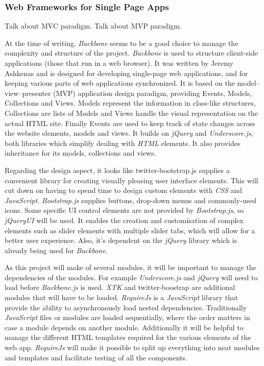 \documentclass[a4paper,11pt,titlepage]{article}
\begin{document}
\subsubsection{Web Frameworks for Single Page Apps}

Talk about MVC paradigm. Talk about MVP paradigm.

At the time of writing, \textit{Backbone} seems to be a good choice to manage the complexity and structure of the project. \textit{Backbone} is used to structure client-side applications (those that run in a web browser). It was written by Jeremy Ashkenas and is designed for developing single-page web applications, and for keeping various parts of web applications synchronized. It is based on the model–view–presenter (MVP) application design paradigm, providing Events, Models, Collections and Views. Models represent the information in class-like structures, Collections are lists of Models and Views handle the visual representation on the actual HTML site. Finally Events are used to keep track of state changes across the website elements, models and views. It builds on \textit{jQuery} and \textit{Underscore.js}, both libraries which simplify dealing with \textit{HTML} elements. It also provides inheritance for its models, collections and views.

Regarding the design aspect, it looks like twitter-bootstrap.js supplies a convenient library for creating visually pleasing user interface elements. This will cut down on having to spend time to design custom elements with \textit{CSS} and \textit{JavaScript}. \textit{Bootstrap.js} supplies buttons, drop-down menus and commonly-used icons. Some specific UI control elements are not provided by \textit{Bootstrap.js}, so \textit{jQueryUI} will be used. It enables the creation and customisation of complex elements such as slider elements with multiple slider tabs, which will allow for a better user experience. Also, it's dependent on the \textit{jQuery} library which is already being used for \textit{Backbone}.

As this project will make of several modules, it will be important to manage the dependencies of the modules. For example \textit{Underscore.js} and \textit{jQuery} will need to load before \textit{Backbone.js} is used. \textit{XTK} and twitter-boostrap are additional modules that will have to be loaded. \textit{RequireJs} is a \textit{JavaScript} library that provide the ability to asynchronously load nested dependencies. Traditionally \textit{JavaScript} files or modules are loaded sequentially, where the order matters in case a module depends on another module. Additionally it will be helpful to manage the different HTML templates required for the various elements of the web app. \textit{RequireJs} will make it possible to split up everything into neat modules and templates and facilitate testing of all the components.
\end{document}
